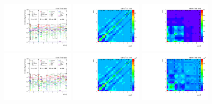 \begin{refsection}
\begin{figure}[htb]
\begin{center}
 \includegraphics[width=0.32\textwidth]{fig_fullRun2UL/unfolding/combined/deltaSystCombinedlog_rebinnedB_b1r_mttbar.pdf}
 \includegraphics[width=0.32\textwidth]{fig_fullRun2UL/unfolding/combined/StatCovMatrix_rebinnedB_b1r_mttbar.pdf}
 \includegraphics[width=0.32\textwidth]{fig_fullRun2UL/unfolding/combined/TotalSystCovMatrix_rebinnedB_b1r_mttbar.pdf} \\
 \includegraphics[width=0.32\textwidth]{fig_fullRun2UL/unfolding/combined/deltaSystCombinedlogNorm_rebinnedB_b1r_mttbar.pdf}
 \includegraphics[width=0.32\textwidth]{fig_fullRun2UL/unfolding/combined/StatCovMatrixNorm_rebinnedB_b1r_mttbar.pdf}
 \includegraphics[width=0.32\textwidth]{fig_fullRun2UL/unfolding/combined/TotalSystCovMatrixNorm_rebinnedB_b1r_mttbar.pdf} \\

\end{center}
\end{figure}
\end{refsection}
